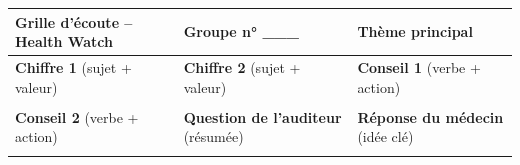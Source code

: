 \documentclass[11pt]{article}
\begin{document}
\begin{center}
\begin{tabularx}{\linewidth}{|X|X|X|}
\hline
\rowcolor{popblueL} \textbf{Grille d'écoute -- Health Watch} & \textbf{Groupe n° \_\_\_} & \textbf{Thème principal} \\ \hline
\textbf{Chiffre 1} (sujet + valeur) & \textbf{Chiffre 2} (sujet + valeur) & \textbf{Conseil 1} (verbe + action) \\ \hline
& & \\ \hline
\textbf{Conseil 2} (verbe + action) & \textbf{Question de l'auditeur} (résumée) & \textbf{Réponse du médecin} (idée clé) \\ \hline
& & \\ \hline
\end{tabularx}
\end{center}
\end{document}
